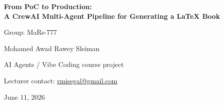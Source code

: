 \documentclass[10pt,a4paper]{report}
\begin{document}
\begin{titlepage}
  \centering
  \vspace*{2cm}
  {\LARGE\bfseries From PoC to Production:\\[0.4em]
   A CrewAI Multi-Agent Pipeline for Generating a \LaTeX{} Book\par}
  \vspace{2cm}
  {\large Group: MaRs-777\par}
  \vspace{0.8cm}
  {\large Mohamed Awad \quad\textbullet\quad Rawey Sleiman\par}
  \vspace{2cm}
  {\large AI Agents / Vibe Coding course project\par}
  \vspace{0.4cm}
  {\large Lecturer contact: \href{mailto:rmisegal@gmail.com}{rmisegal@gmail.com}\par}
  \vfill
  {\large June 11, 2026\par}
\end{titlepage}



\tableofcontents










\nocite{mars777_prd,mars777_plan,mars777_quality,mars777_costs,mars777_decisions}
\printbibliography[heading=bibintoc,title={Bibliography}]
\end{document}
